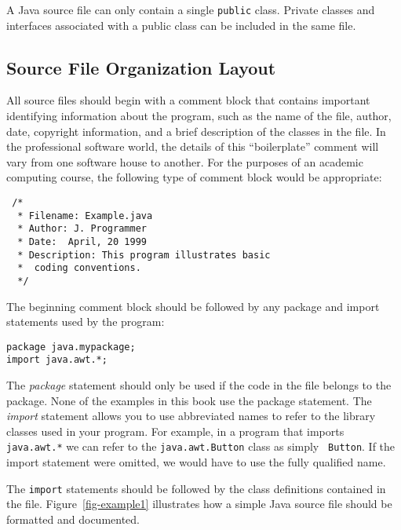 A Java source file can only contain a single {\tt public}
class.  Private classes and interfaces associated with a public class
can be included in the same file.


\subsection*{Source File Organization Layout}
\noindent All source files should begin with a comment block that contains
important identifying information about the program, such as the name
of the file, author, date, copyright information, and a brief
description of the classes in the file.  In the professional software
world, the details of this ``boilerplate'' comment will vary from one
software house to another.  For the purposes of an academic computing
course, the following type of comment block would be appropriate:

\begin{jjjlisting}
\begin{lstlisting}
 /*
  * Filename: Example.java
  * Author: J. Programmer
  * Date:  April, 20 1999
  * Description: This program illustrates basic 
  *  coding conventions.
  */
\end{lstlisting}
\end{jjjlisting}

\noindent The beginning comment block should be followed by any package
and import statements used by the program:

\begin{jjjlisting}
\begin{lstlisting}
package java.mypackage;
import java.awt.*;
\end{lstlisting}
\end{jjjlisting}

\noindent The {\it package} statement should only be used if the code
in the file belongs to the package.  None of the examples in this book
use the package statement.  The {\it import} statement allows you to
use abbreviated names to refer to the library classes used in your
program.   For example, in a program that imports {\tt java.awt.*} we
can refer to the {\tt java.awt.Button} class as simply {\tt
Button}. If the import statement were omitted, we would have to use the
fully qualified name.

The {\tt import} statements should be followed by the class definitions
contained in the file.  Figure~\ref{fig-example1} illustrates how a
simple Java source file should be formatted and documented.

